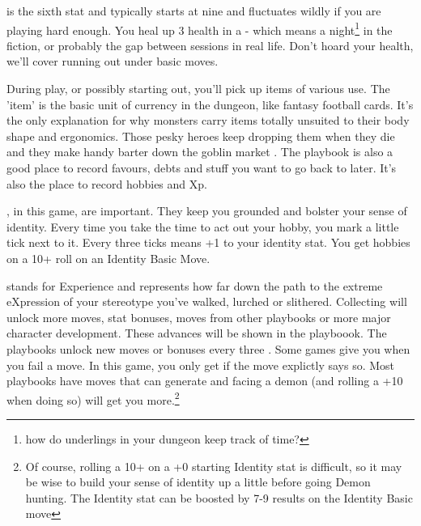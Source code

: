 \documentclass{tufte-book}
\begin{document}
 is the sixth stat and typically starts at nine and fluctuates wildly if you are playing hard enough. You heal up 3 health in a  - which means a night\footnote{how do underlings in your dungeon keep track of time?} in the fiction, or probably the gap between sessions in real life. Don't hoard your health, we'll cover running out under basic moves. 

 During play, or possibly starting out, you'll pick up items of various use. The 'item' is the basic unit of currency in the dungeon, like fantasy football cards. It's the only explanation for why monsters carry items totally unsuited to their body shape and ergonomics. Those pesky heroes keep dropping them when they die and they make handy barter down the goblin market .  The playbook is also a good place to record favours, debts and stuff you want to go back to later. It's also the place to record hobbies and Xp. 

, in this game, are important. They keep you grounded and bolster your sense of identity. Every time you take the time to act out your hobby, you mark a little tick next to it. Every three ticks means +1 to your identity stat. You get hobbies on a 10+ roll on an Identity Basic Move. 

 stands for Experience and represents  how far down the path to the extreme eXpression of your stereotype you've walked, lurched or slithered. Collecting  will unlock more moves, stat bonuses, moves from other playbooks or more major character development. These advances will be shown in the playboook. The playbooks unlock new moves or bonuses every three . Some games give you  when you fail a move. In this game, you only get  if the move explictly says so. Most playbooks have moves that can generate  and facing a demon (and rolling a +10 when doing so) will get you more.\footnote{Of course, rolling a 10+ on a +0 starting Identity stat is difficult, so it may be wise to build your sense of identity up a little before going Demon hunting. The Identity stat can be boosted by 7-9 results on the Identity Basic move}
\end{document}

